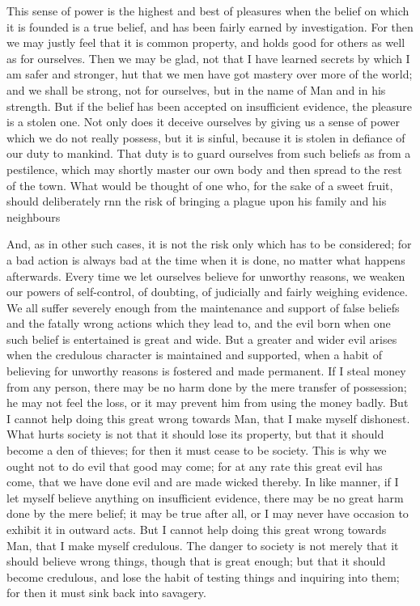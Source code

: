 \documentclass[12pt]{article}
\begin{document}
This sense of power is the highest and best of pleasures when the belief on which it is founded is a true belief, and has been fairly earned by investigation. For then we may justly feel that it is common property, and holds good for others as well as for ourselves. Then we may be glad, not that I have learned secrets by which I am safer and stronger, hut that we men have got mastery over more of the world; and we shall be strong, not for ourselves, but in the name of Man and in his strength. But if the belief has been accepted on insufficient evidence, the pleasure is a stolen one. Not only does it deceive ourselves by giving us a sense of power which we do not really possess, but it is sinful, because it is stolen in defiance of our duty to mankind. That duty is to guard ourselves from such beliefs as from a pestilence, which may shortly master our own body and then spread to the rest of the town. What would be thought of one who, for the sake of a sweet fruit, should deliberately rnn the risk of bringing a plague upon his family and his neighbours ~

And, as in other such cases, it is not the risk only which has to be considered; for a bad action is always bad at the time when it is done, no matter what happens afterwards. Every time we let ourselves believe for unworthy reasons, we weaken our powers of self-control, of doubting, of judicially and fairly weighing evidence. We all suffer severely enough from the maintenance and support of false beliefs and the fatally wrong actions which they lead to, and the evil born when one such belief is entertained is great and wide. But a greater and wider evil arises when the credulous character is maintained and supported, when a habit of believing for unworthy reasons is fostered and made permanent. If I steal money from any person, there may be no harm done by the mere transfer of possession; he may not feel the loss, or it may prevent him from using the money badly. But I cannot help doing this great wrong towards Man, that I make myself dishonest. What hurts society is not that it should lose its property, but that it should become a den of thieves; for then it must cease to be society. This is why we ought not to do evil that good may come; for at any rate this great evil has come, that we have done evil and are made wicked thereby. In like manner, if I let myself believe anything on insufficient evidence, there may be no great harm done by the mere belief; it may be true after all, or I may never have occasion to exhibit it in outward acts. But I cannot help doing this great wrong towards Man, that I make myself credulous. The danger to society is not merely that it should believe wrong things, though that is great enough; but that it should become credulous, and lose the habit of testing things and inquiring into them; for then it must sink back into savagery.
\end{document}
